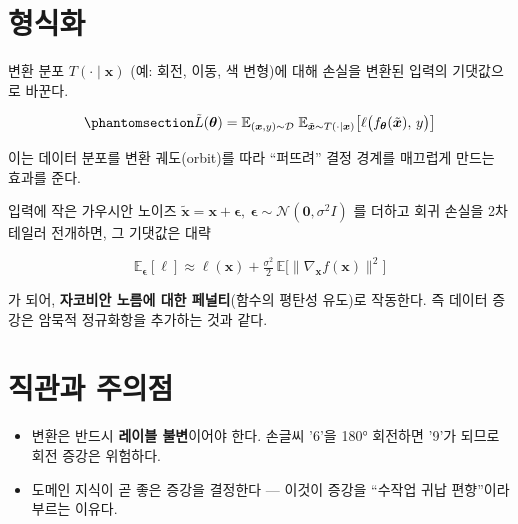 \documentclass[
  letterpaper,
  DIV=11,
  numbers=noendperiod]{scrreprt}
\providecommand{\tightlist}{%
  \setlength{\itemsep}{0pt}\setlength{\parskip}{0pt}}
\begin{document}
\section{형식화}\label{uxd615uxc2dduxd654}

변환 분포 \(T(\cdot\mid\bm{x})\) (예: 회전, 이동, 색 변형)에 대해 손실을
변환된 입력의 기댓값으로 바꾼다.

\begin{equation}\protect\phantomsection\label{eq-aug}{
\tilde{L}(\bm{\theta}) = \mathbb{E}_{(\bm{x},y)\sim\mathcal{D}}\;\mathbb{E}_{\tilde{\bm{x}}\sim T(\cdot\mid\bm{x})}\big[\ell\big(f_{\bm{\theta}}(\tilde{\bm{x}}),\,y\big)\big]
}\end{equation}

이는 데이터 분포를 변환 궤도(orbit)를 따라 ``퍼뜨려'' 결정 경계를
매끄럽게 만드는 효과를 준다.

\begin{tcolorbox}[enhanced jigsaw, arc=.35mm, bottomrule=.15mm, bottomtitle=1mm, breakable, colback=white, colbacktitle=quarto-callout-tip-color!10!white, colframe=quarto-callout-tip-color-frame, coltitle=black, left=2mm, leftrule=.75mm, opacityback=0, opacitybacktitle=0.6, rightrule=.15mm, title=\textcolor{quarto-callout-tip-color}{\faLightbulb}\hspace{0.5em}{노이즈 주입 = \(\ell_2\) 정규화 (소량 가우시안의 경우)}, titlerule=0mm, toprule=.15mm, toptitle=1mm]

입력에 작은 가우시안 노이즈
\(\tilde{\bm{x}}=\bm{x}+\bm{\epsilon},\ \bm{\epsilon}\sim\mathcal{N}(\bm{0},\sigma^2 I)\)
를 더하고 회귀 손실을 2차 테일러 전개하면, 그 기댓값은 대략

\[
\mathbb{E}_{\bm{\epsilon}}[\ell] \approx \ell(\bm{x}) + \tfrac{\sigma^2}{2}\,\mathbb{E}\big[\|\nabla_{\bm{x}} f(\bm{x})\|^2\big]
\]

가 되어, \textbf{자코비안 노름에 대한 페널티}(함수의 평탄성 유도)로
작동한다. 즉 데이터 증강은 암묵적 정규화항을 추가하는 것과 같다.

\end{tcolorbox}

\section{직관과 주의점}\label{uxc9c1uxad00uxacfc-uxc8fcuxc758uxc810}

\begin{itemize}
\tightlist
\item
  변환은 반드시 \textbf{레이블 불변}이어야 한다. 손글씨 '6'을 180°
  회전하면 '9'가 되므로 회전 증강은 위험하다.
\item
  도메인 지식이 곧 좋은 증강을 결정한다 --- 이것이 증강을 ``수작업 귀납
  편향''이라 부르는 이유다.
\end{itemize}
\end{document}
